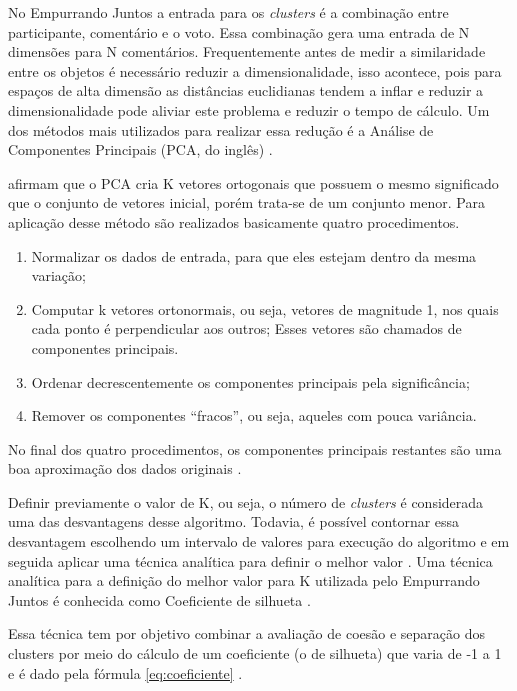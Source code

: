 No Empurrando Juntos a entrada para os \textit{clusters} é a combinação entre participante,  
comentário e o voto. Essa combinação gera uma entrada de N dimensões para N comentários.
Frequentemente antes de medir a similaridade entre os objetos é necessário
reduzir a dimensionalidade, isso acontece, pois para espaços de alta dimensão as distâncias euclidianas
tendem a inflar e reduzir a dimensionalidade pode aliviar este problema e reduzir o tempo de cálculo.
Um dos métodos mais utilizados para realizar essa redução é a Análise de 
Componentes Principais (PCA, do inglês) \cite{han2011data, sklearn}.


 afirmam que o PCA cria K vetores ortogonais que possuem o mesmo significado que o conjunto
de vetores inicial, porém trata-se de um conjunto menor. Para aplicação desse método são realizados basicamente quatro procedimentos.

\begin{enumerate}
 \item Normalizar os dados de entrada, para que eles estejam dentro da mesma variação;
 \item Computar k vetores ortonormais, ou seja, vetores de magnitude 1, nos quais cada ponto é perpendicular aos outros;
  \subitem Esses vetores são chamados de componentes principais.
 \item Ordenar decrescentemente os componentes principais pela significância;
 \item Remover os componentes ``fracos'', ou seja, aqueles com pouca variância.
\end{enumerate}

No final dos quatro procedimentos, os componentes principais restantes são uma boa aproximação dos dados originais \cite{han2011data}.

Definir previamente o valor de K, ou seja, o número de \textit{clusters} é considerada uma das desvantagens desse algoritmo. Todavia,
é possível contornar essa desvantagem escolhendo um intervalo de valores para execução do algoritmo e em seguida aplicar
uma técnica analítica para definir o melhor valor \cite{han2011data}. Uma técnica analítica para a definição do melhor valor para K utilizada pelo Empurrando Juntos
é conhecida como Coeficiente de silhueta \cite{sklearn}.

Essa técnica tem por objetivo combinar a avaliação de coesão e separação dos clusters por meio do cálculo de um coeficiente (o de silhueta) que 
varia de -1 a 1 e é dado pela fórmula \ref{eq:coeficiente} \cite{tan2013data}.

